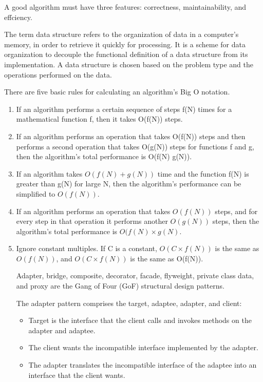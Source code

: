 \begin{mdframed}[style=theorem, frametitle={Algorithm Features}]
	A good algorithm must have three features: correctness, maintainability, and
effciency.
\end{mdframed}

\begin{mdframed}[style=important, frametitle={Data Structures}]
The term data structure refers to the organization of data in a
computer's memory, in order to retrieve it quickly for processing.
It is a scheme for data organization to decouple the functional
definition of a data structure from its implementation. A data
structure is chosen based on the problem type and the
operations performed on the data.
\end{mdframed}

There are five basic rules for calculating an algorithm’s Big O notation.

\begin{enumerate}
\item If an algorithm performs a certain sequence of steps f(N) times for a mathematical function f, then it takes O(f(N)) steps.
\item  If an algorithm performs an operation that takes O(f(N)) steps and then
performs a second operation that takes O(g(N)) steps for functions f and
g, then the algorithm’s total performance is O(f(N) g(N)).
\item  If an algorithm takes $O(f(N)+g(N))$ time and the function f(N) is greater
than g(N) for large N, then the algorithm’s performance can be simplified
to $O(f(N))$.
\item  If an algorithm performs an operation that takes $O(f(N))$ steps, and for
every step in that operation it performs another $O(g(N))$ steps, then the
algorithm’s total performance is $O(f(N)\times g(N)$.
\item  Ignore constant multiples. If C is a constant, $O(C \times f(N))$ is the same as
$O(f(N))$, and $O(C \times f(N))$ is the same as O(f(N)).

Adapter, bridge, composite,
decorator, facade, flyweight, private class data, and proxy are the
Gang of Four (GoF) structural design patterns. 

The adapter pattern comprises the target, adaptee, adapter, and
client:
\begin{itemize}
\item Target is the interface that the client calls and invokes
methods on the adapter and adaptee.
\item The client wants the incompatible interface implemented
by the adapter.
\item The adapter translates the incompatible interface of the
adaptee into an interface that the client wants.
\end{itemize}


\end{enumerate}